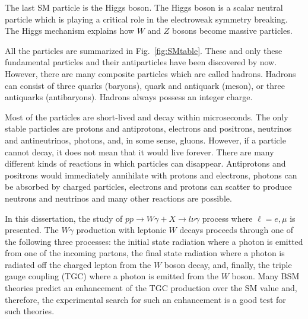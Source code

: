 The last SM particle is the Higgs boson. The Higgs boson is a scalar neutral particle which is playing a critical role in the electroweak symmetry breaking. The Higgs mechanism explains how $W$ and $Z$ bosons become massive particles.

All the particles are summarized in Fig.~\ref{fig:SMtable}. These and only these fundamental particles and their antiparticles have been discovered by now. However, there are many composite particles which are called hadrons. Hadrons can consist of three quarks (baryons), quark and antiquark (meson), or three antiquarks (antibaryons). Hadrons always possess an integer charge.

Most of the particles are short-lived and decay within microseconds. The only stable particles are protons and antiprotons, electrons and positrons, neutrinos and antineutrinos, photons, and, in some sense, gluons. However, if a particle cannot decay, it does not mean that it would live forever. There are many different kinds of reactions in which particles can disappear. Antiprotons and positrons would immediately annihilate with protons and electrons, photons can be absorbed by charged particles, electrons and protons can scatter to produce neutrons and neutrinos and many other reactions are possible. 

In this dissertation, the study of $pp\rightarrow W\gamma + X \rightarrow l \nu \gamma$ process where $\ell = e, \mu$ is presented. The $W\gamma$ production with leptonic $W$ decays proceeds through one of the following three processes: the initial state radiation where a photon is emitted from one of the incoming partons, the final state radiation where a photon is radiated off the charged lepton from the $W$ boson decay, and, finally, the triple gauge coupling (TGC) where a photon is emitted from the $W$ boson. Many BSM theories predict an enhancement of the TGC production over the SM value and, therefore, the experimental search for such an enhancement is a good test for such theories. 


